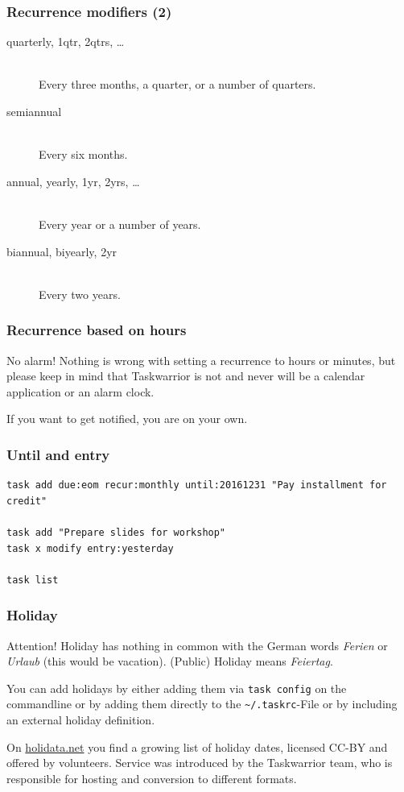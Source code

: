 \documentclass[t,handout]{beamer}
\begin{document}
\begin{frame}[fragile]\frametitle{Recurrence modifiers (2)}
    \vfill
    \begin{description}
        \item[quarterly, 1qtr, 2qtrs, \ldots] \hfill \\
            Every three months, a quarter, or a number of quarters.
        \item[semiannual] \hfill \\
            Every six months.
        \item[annual, yearly, 1yr, 2yrs, \ldots] \hfill \\
            Every year or a number of years.
        \item[biannual, biyearly, 2yr] \hfill \\
            Every two years.
    \end{description}
\end{frame}

\begin{frame}[fragile]\frametitle{Recurrence based on hours}
    \vfill
    \begin{alertblock}{No alarm!}
        Nothing is wrong with setting a recurrence to hours or minutes, but please keep in mind that Taskwarrior is not and never will be a calendar application or an alarm clock.

        If you want to get notified, you are on your own.
    \end{alertblock}
\end{frame}


\begin{frame}[fragile]\frametitle{Until and entry}
    \vfill
    \begin{lstlisting}
task add due:eom recur:monthly until:20161231 "Pay installment for credit"

task add "Prepare slides for workshop"
task x modify entry:yesterday

task list\end{lstlisting}
\end{frame}

\begin{frame}[fragile]\frametitle{Holiday}
    \vfill
    \begin{alertblock}{Attention!}
        Holiday has nothing in common with the German words \textit{Ferien} or \textit{Urlaub} (this would be vacation). (Public) Holiday means \textit{Feiertag}.
    \end{alertblock} \pause

    You can add holidays by either adding them via \verb=task config= on the commandline or by adding them directly to the \verb=~/.taskrc=-File or by including an external holiday definition. \pause

    On \href{http://holidata.net/}{holidata.net} you find a growing list of holiday dates, licensed CC-BY and offered by volunteers. Service was introduced by the Taskwarrior team, who is responsible for hosting and conversion to different formats.
\end{frame}
\end{document}
